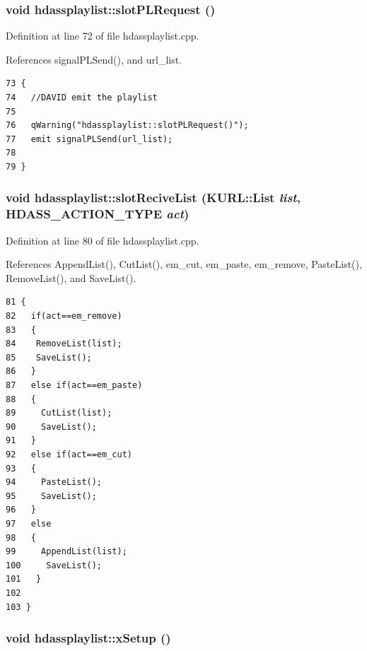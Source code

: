 \subsubsection{\setlength{\rightskip}{0pt plus 5cm}void hdassplaylist::slot\-PLRequest ()\hspace{0.3cm}{\tt  [slot]}}\label{classhdassplaylist_hdassplaylisti0}




Definition at line 72 of file hdassplaylist.cpp.

References signal\-PLSend(), and url\_\-list.



\footnotesize\begin{verbatim}73 {
74   //DAVID emit the playlist
75  
76   qWarning("hdassplaylist::slotPLRequest()");
77   emit signalPLSend(url_list);
78   
79 }
\end{verbatim}\normalsize 
{}
\subsubsection{\setlength{\rightskip}{0pt plus 5cm}void hdassplaylist::slot\-Recive\-List (KURL::List {\em list}, {\bf HDASS\_\-ACTION\_\-TYPE} {\em act})\hspace{0.3cm}{\tt  [slot]}}\label{classhdassplaylist_hdassplaylisti1}




Definition at line 80 of file hdassplaylist.cpp.

References Append\-List(), Cut\-List(), em\_\-cut, em\_\-paste, em\_\-remove, Paste\-List(), Remove\-List(), and Save\-List().



\footnotesize\begin{verbatim}81 {
82   if(act==em_remove)
83   {
84    RemoveList(list);
85    SaveList();
86   }
87   else if(act==em_paste)
88   {
89     CutList(list);
90     SaveList();
91   }
92   else if(act==em_cut)
93   {
94     PasteList();
95     SaveList();
96   }
97   else 
98   {
99     AppendList(list);
100     SaveList();
101   }
102   
103 }
\end{verbatim}\normalsize 
{}
\subsubsection{\setlength{\rightskip}{0pt plus 5cm}void hdassplaylist::x\-Setup ()}\label{classhdassplaylist_hdassplaylista2}




